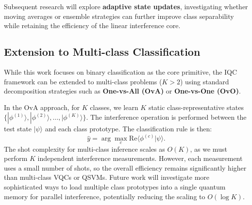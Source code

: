 \documentclass[conference]{IEEEtran}
\begin{document}
Subsequent research will explore \textbf{adaptive state updates}, investigating whether moving averages or ensemble strategies can further improve class separability while retaining the efficiency of the linear interference core.

\subsection{Extension to Multi-class Classification}
While this work focuses on binary classification as the core primitive, the IQC framework can be extended to multi-class problems ($K > 2$) using standard decomposition strategies such as \textbf{One-vs-All (OvA)} or \textbf{One-vs-One (OvO)}.

In the OvA approach, for $K$ classes, we learn $K$ static class-representative states $\{|\phi^{(1)}\rangle, |\phi^{(2)}\rangle, \dots, |\phi^{(K)}\rangle\}$. The interference operation is performed between the test state $|\psi\rangle$ and each class prototype. The classification rule is then:
\begin{equation}
    \hat{y} = \arg\max_c \mathrm{Re}\langle \phi^{(c)} | \psi \rangle.
\end{equation}
The shot complexity for multi-class inference scales as $O(K)$, as we must perform $K$ independent interference measurements. However, each measurement uses a small number of shots, so the overall efficiency remains significantly higher than multi-class VQCs or QSVMs. Future work will investigate more sophisticated ways to load multiple class prototypes into a single quantum memory for parallel interference, potentially reducing the scaling to $O(\log K)$.
\end{document}
